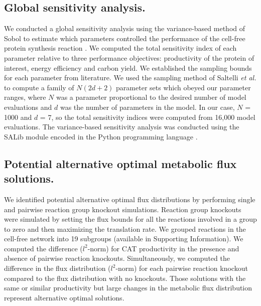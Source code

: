 \documentclass[journal=asbcd6,manuscript=article]{achemso}
\begin{document}
\subsection*{Global sensitivity analysis.}
We conducted a global sensitivity analysis using the variance-based method of Sobol to estimate which parameters controlled the performance of the cell-free protein synthesis reaction \citep{SOBOL_METHOD}.
We computed the total sensitivity index of each parameter relative to three performance objectives: productivity of the protein of interest, energy efficiency and carbon yield.
We established the sampling bounds for each parameter from literature.
We used the sampling method of Saltelli \textit{et al.} \citep{Saltelli:2010} to compute a family of $N\left(2d+2\right)$ parameter sets which obeyed our parameter ranges,
where $N$ was a parameter proportional to the desired number of model evaluations and $d$ was the number of parameters in the model. In our case, $N$ = 1000 and $d$ = 7, so the total sensitivity indices were computed from 16,000 model evaluations. The variance-based sensitivity analysis was conducted using the SALib module encoded in the Python programming language \citep{SALIB}.

\subsection*{Potential alternative optimal metabolic flux solutions.}
We identified potential alternative optimal flux distributions by performing single and pairwise reaction group knockout simulations.
Reaction group knockouts were simulated by setting the flux bounds for all the reactions involved in a group to zero and then maximizing the translation rate.
We grouped reactions in the cell-free network into 19 subgroups (available in Supporting Information).
We computed the difference ($l^{2}$-norm) for CAT productivity in the presence and absence of pairwise reaction knockouts.
Simultaneously, we computed the difference in the flux distribution ($l^{2}$-norm) for each pairwise reaction knockout compared to the flux distribution with no knockouts.
Those solutions with the same or similar productivity but large changes in the metabolic flux distribution represent alternative optimal solutions.
\end{document}
